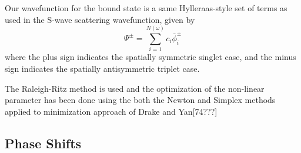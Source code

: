 \documentclass[preprint,showpacs,preprintnumbers,amsmath,amssymb]{revtex4}
\begin{document}
 

Our wavefunction for the bound state is a same  Hylleraas-style set of terms as used in the S-wave scattering wavefunction, given by
\begin{equation}
\label{eq:BoundWavefn}
\Psi^\pm = \sum_{i=1}^{N(\omega)} c_i \bar{\phi}_i^\pm
\end{equation}
\noindent where the plus sign indicates the spatially symmetric singlet case, and the minus sign indicates the spatially antisymmetric triplet case.

The Raleigh-Ritz method is used and the optimization of the non-linear parameter has been done using the both the Newton and Simplex methods applied to minimization approach of Drake and Yan[74???]




\subsection{Phase Shifts}
\end{document}
